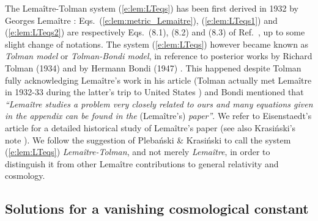 \begin{hist}
The Lemaître-Tolman system (\ref{e:lem:LTeqs}) has been first derived
in 1932 by Georges Lemaître \cite{Lemai32}:
Eqs.~(\ref{e:lem:metric_Lemaitre}), (\ref{e:lem:LTeqs1}) and (\ref{e:lem:LTeqs2}) are
respectively Eqs.~(8.1), (8.2) and (8.3) of Ref.~\cite{Lemai32}, up to some slight
change of notations.
The system (\ref{e:lem:LTeqs}) however became known as \emph{Tolman model}
or \emph{Tolman-Bondi model}, in reference
to posterior works by Richard Tolman (1934) \cite{Tolma34}
and by Hermann Bondi (1947) \cite{Bondi47}.
This happened despite Tolman fully acknowledging Lemaître's work \cite{Lemai32} in his
article \cite{Tolma34} (Tolman actually met Lemaître in 1932-33 during
the latter's trip to United States \cite{Eisen93}) and Bondi \cite{Bondi47} mentioned
that \emph{``Lemaître studies a problem very closely related to ours
and many equations given in the appendix can be found in the} (Lemaître's) \emph{paper''}.
We refer to Eisenstaedt's article \cite{Eisen93} for a detailed historical
study of Lemaître's paper \cite{Lemai32} (see also Krasi\'nski's note \cite{Krasi97}).
We follow the suggestion of Pleba\'nski \& Krasi\'nski \cite{PlebaK06}
to call the system (\ref{e:lem:LTeqs}) \emph{Lemaître-Tolman}, and not
merely \emph{Lemaître}, in order to distinguish it from other Lemaître contributions
to general relativity and cosmology.
\end{hist}

\subsection{Solutions for a vanishing cosmological constant} \label{s:lem:sol_lambda_zero}

